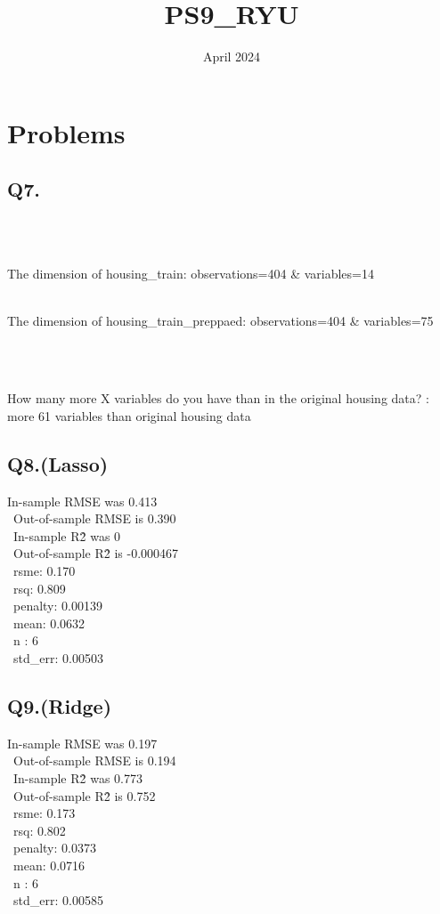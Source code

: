 \documentclass{article}
\title{PS9\_RYU}
\date{April 2024}
\begin{document}
\maketitle

\section{Problems}


\subsection{Q7.}

\\\

The dimension of housing\_train: observations=404 \& variables=14
\\\

The dimension of housing\_train\_preppaed: observations=404 \& variables=75

\\\

How many more X variables do you have than in the original housing data?
: more 61 variables than original housing data




\subsection{Q8.(Lasso)}


In-sample RMSE was 0.413
\\\
Out-of-sample RMSE is 0.390
\\\
In-sample R\^2 was 0
\\\
Out-of-sample R\^2 is -0.000467
\\\
rsme: 0.170
\\\
rsq: 0.809
\\\
penalty: 0.00139
\\\
mean: 0.0632
\\\
n : 6
\\\
std\_err: 0.00503


\subsection{Q9.(Ridge)}
In-sample RMSE was 0.197
\\\
Out-of-sample RMSE is 0.194
\\\
In-sample R\^2 was 0.773
\\\
Out-of-sample R\^2 is 0.752
\\\
rsme: 0.173
\\\
rsq: 0.802
\\\
penalty: 0.0373
\\\
mean: 0.0716
\\\
n : 6
\\\
std\_err: 0.00585
\end{document}
